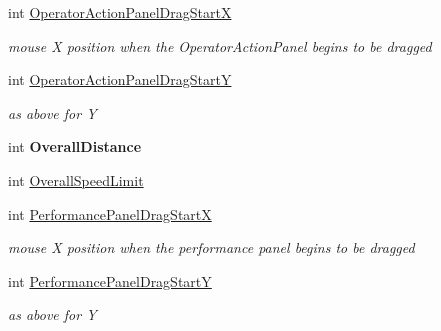 \begin{DoxyCompactItemize}
\mbox{\label{class_t_interface_aefa2e04a18c5bf935ad977bfb2a4f7eb}} 
int \mbox{\hyperlink{class_t_interface_aefa2e04a18c5bf935ad977bfb2a4f7eb}{Operator\+Action\+Panel\+Drag\+StartX}}
\begin{DoxyCompactList}\small\item\em mouse \textquotesingle{}X\textquotesingle{} position when the Operator\+Action\+Panel begins to be dragged \end{DoxyCompactList}\item 
\mbox{\label{class_t_interface_a96a87be70f36ce7820f10159edceac4a}} 
int \mbox{\hyperlink{class_t_interface_a96a87be70f36ce7820f10159edceac4a}{Operator\+Action\+Panel\+Drag\+StartY}}
\begin{DoxyCompactList}\small\item\em as above for \textquotesingle{}Y\textquotesingle{} \end{DoxyCompactList}\item 
\mbox{\label{class_t_interface_a7ed3107d6e8a3851b082a7f655aa9a25}} 
int {\bfseries Overall\+Distance}
\item 
int \mbox{\hyperlink{class_t_interface_acc810716df0d41cad86bcba2027ff93e}{Overall\+Speed\+Limit}}
\item 
\mbox{\label{class_t_interface_a8822ab4cd1d23901ad2ada3a2ce3ead9}} 
int \mbox{\hyperlink{class_t_interface_a8822ab4cd1d23901ad2ada3a2ce3ead9}{Performance\+Panel\+Drag\+StartX}}
\begin{DoxyCompactList}\small\item\em mouse \textquotesingle{}X\textquotesingle{} position when the performance panel begins to be dragged \end{DoxyCompactList}\item 
\mbox{\label{class_t_interface_a203fbc2c91d611c8f0cf64a18336793d}} 
int \mbox{\hyperlink{class_t_interface_a203fbc2c91d611c8f0cf64a18336793d}{Performance\+Panel\+Drag\+StartY}}
\begin{DoxyCompactList}\small\item\em as above for \textquotesingle{}Y\textquotesingle{} \end{DoxyCompactList}\item 
\mbox{\label{class_t_interface_a8de4dd369bbe7242656b440db1fb1a37}} 

\end{DoxyCompactItemize}
